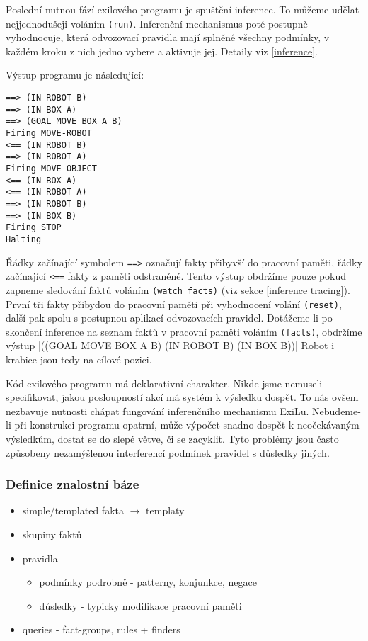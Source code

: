 Poslední nutnou fází exilového programu je spuštění inference. To můžeme udělat
nejjednodušeji voláním \verb|(run)|. Inferenční mechanismus poté postupně
vyhodnocuje, která odvozovací pravidla mají splněné všechny podmínky, v každém
kroku z nich jedno vybere a aktivuje jej. Detaily viz \ref{inference}.

Výstup programu je následující:
\begin{verbatim}
==> (IN ROBOT B)
==> (IN BOX A)
==> (GOAL MOVE BOX A B)
Firing MOVE-ROBOT
<== (IN ROBOT B)
==> (IN ROBOT A)
Firing MOVE-OBJECT
<== (IN BOX A)
<== (IN ROBOT A)
==> (IN ROBOT B)
==> (IN BOX B)
Firing STOP
Halting
\end{verbatim}
Řádky začínající symbolem \verb|==>| označují fakty přibyvší do pracovní paměti,
řádky začínající \verb|<==| fakty z paměti odstraněné. Tento výstup obdržíme
pouze pokud zapneme sledování faktů voláním \verb|(watch facts)| (viz sekce
\ref{inference tracing}). První tři fakty přibydou do pracovní paměti při
vyhodnocení volání \verb|(reset)|, další pak spolu s postupnou aplikací
odvozovacích pravidel. Dotážeme-li po skončení inference na seznam faktů v
pracovní paměti voláním \verb|(facts)|, obdržíme výstup
\cl|((GOAL MOVE BOX A B) (IN ROBOT B) (IN BOX B))|
Robot i krabice jsou tedy na cílové pozici.

Kód exilového programu má deklarativní charakter. Nikde jsme nemuseli
specifikovat, jakou posloupností akcí má systém k výsledku dospět. To nás ovšem
nezbavuje nutnosti chápat fungování inferenčního mechanismu ExiLu. Nebudeme-li
při konstrukci programu opatrní, může výpočet snadno dospět k neočekávaným
výsledkům, dostat se do slepé větve, či se zacyklit. Tyto problémy jsou často
způsobeny nezamýšlenou interferencí podmínek pravidel s důsledky jiných.

\FloatBarrier

\subsubsection{Definice znalostní báze}
\label{knowledge base definition}
\begin{framed}
  \begin{itemize}
    \item simple/templated fakta $\rightarrow$ templaty
    \item skupiny faktů
    \item pravidla
      \begin{itemize}
        \item podmínky podrobně - patterny, konjunkce, negace
        \item důsledky - typicky modifikace pracovní paměti
      \end{itemize}
    \item queries - fact-groups, rules + finders
  \end{itemize}
\end{framed}

